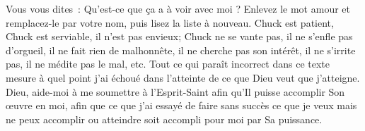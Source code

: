 Vous vous dites~:
 \og Qu'est-ce que ça a à voir avec moi ? \fg{}
 Enlevez le mot \og amour \fg{} et remplacez-le par votre nom,
 puis lisez la liste à nouveau.
 \og Chuck est patient, Chuck est serviable, il n'est pas envieux;
 Chuck ne se vante pas, il ne s'enfle pas d'orgueil, il ne fait rien
 de malhonnête, il ne cherche pas son intérêt, il ne s'irrite pas,
 il ne médite pas le mal, etc. \fg{}
 Tout ce qui paraît incorrect dans ce texte mesure à quel point j'ai échoué
 dans l'atteinte de ce que Dieu veut que j'atteigne.
 Dieu, aide-moi à me soumettre à l'Esprit-Saint afin qu'Il puisse accomplir
 Son œuvre en moi, afin que ce que j'ai essayé de faire sans succès
 \ocadr ce que je veux mais ne peux accomplir ou atteindre \fcadr
 soit accompli pour moi par Sa puissance.

\closechapter

